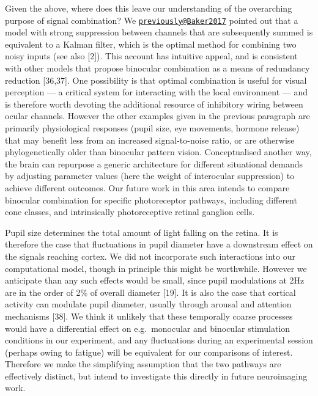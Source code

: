 \documentclass[
]{article}
\begin{document}
Given the above, where does this leave our understanding of the overarching purpose of signal combination? We \href{mailto:previously@Baker2017}{\nolinkurl{previously@Baker2017}} pointed out that a model with strong suppression between channels that are subsequently summed is equivalent to a Kalman filter, which is the optimal method for combining two noisy inputs (see also {[}2{]}). This account has intuitive appeal, and is consistent with other models that propose binocular combination as a means of redundancy reduction {[}36,37{]}. One possibility is that optimal combination is useful for visual perception --- a critical system for interacting with the local environment --- and is therefore worth devoting the additional resource of inhibitory wiring between ocular channels. However the other examples given in the previous paragraph are primarily physiological responses (pupil size, eye movements, hormone release) that may benefit less from an increased signal-to-noise ratio, or are otherwise phylogenetically older than binocular pattern vision. Conceptualised another way, the brain can repurpose a generic architecture for different situational demands by adjusting parameter values (here the weight of interocular suppression) to achieve different outcomes. Our future work in this area intends to compare binocular combination for specific photoreceptor pathways, including different cone classes, and intrinsically photoreceptive retinal ganglion cells.

Pupil size determines the total amount of light falling on the retina. It is therefore the case that fluctuations in pupil diameter have a downstream effect on the signals reaching cortex. We did not incorporate such interactions into our computational model, though in principle this might be worthwhile. However we anticipate than any such effects would be small, since pupil modulations at 2Hz are in the order of 2\% of overall diameter {[}19{]}. It is also the case that cortical activity can modulate pupil diameter, usually through arousal and attention mechanisms {[}38{]}. We think it unlikely that these temporally coarse processes would have a differential effect on e.g.~monocular and binocular stimulation conditions in our experiment, and any fluctuations during an experimental session (perhaps owing to fatigue) will be equivalent for our comparisons of interest. Therefore we make the simplifying assumption that the two pathways are effectively distinct, but intend to investigate this directly in future neuroimaging work.
\end{document}
